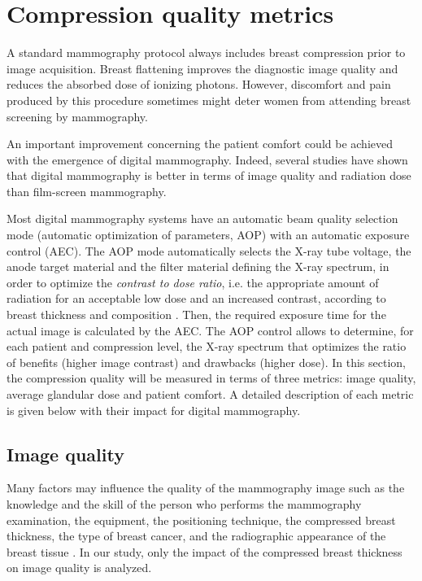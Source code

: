 \section{Compression quality metrics}
A standard mammography protocol always includes breast compression prior to image acquisition. Breast flattening improves the diagnostic image quality and reduces the absorbed dose of ionizing photons. However, discomfort and pain produced by this procedure sometimes might deter women from attending breast screening by mammography. 

An important improvement concerning the patient comfort could be achieved with the emergence of digital mammography. Indeed, several studies have shown that digital mammography is better in terms of image quality \citep{obenauer_screen_2002} and radiation dose \citep{chen_analysis_2012} than film-screen mammography.

Most digital mammography systems have an automatic beam quality selection mode (automatic optimization of parameters, AOP) with an automatic exposure control (AEC). The AOP mode automatically selects the X-ray  tube  voltage, the anode  target  material  and the filter  material defining the X-ray spectrum, in order to optimize the \textit{contrast to dose ratio}, i.e. the appropriate amount of radiation for an acceptable low dose and an increased contrast, according to breast thickness and composition \citep{williams_optimization_2008}. Then, the required exposure time for the actual image is calculated by the AEC.  The AOP control allows to determine, for each patient and compression level, the X-ray spectrum that optimizes the  ratio of benefits  (higher image contrast) and  drawbacks  (higher  dose). 
In this section, the compression quality will be measured in terms of three metrics: image quality, average glandular dose and patient comfort. A detailed description of each metric is given below with their impact for digital mammography. 

\subsection{Image quality}

Many factors may influence the quality of the mammography image such as the knowledge and the skill of the person who performs the mammography examination, the equipment, the positioning
technique, the compressed breast thickness, the type of breast cancer, and the radiographic appearance of the breast tissue \citep{de_pain_2015,andolina2011mammographic}. In our study, only the impact of the compressed breast thickness on image quality is analyzed.

